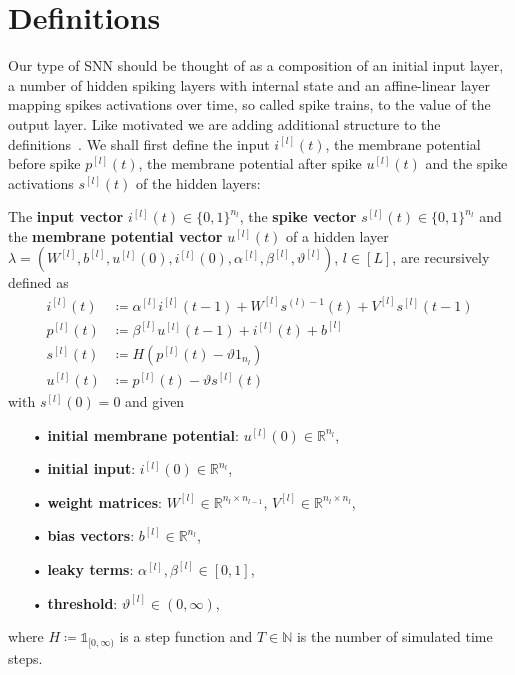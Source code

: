 \section{Definitions}
\label{ch:defs}

Our type of SNN should be thought of as a composition of an initial input layer, a number of hidden spiking layers with internal state and an affine-linear layer mapping spikes activations over time, so called spike trains, to the value of the output layer.
Like motivated we are adding additional structure to the definitions~\cite{nguyen2025timespikeunderstandingrepresentational}.
We shall first define the input \(i^{[l]}(t)\), the membrane potential before spike \(p^{[l]}(t)\), the membrane potential after spike \(u^{[l]}(t)\) and the spike activations \(s^{[l]}(t)\) of the hidden layers:

\begin{definition}
  The \textbf{input vector} \(i^{[l]}(t)∈\{0,1\}^{n_l}\), the \textbf{spike vector} \(s^{[l]}(t)∈\{0,1\}^{n_l}\) and the \textbf{membrane potential vector} \(u^{[l]}(t)\) of a hidden layer \(λ=(W^{[l]},b^{[l]},u^{[l]}(0),i^{[l]}(0),α^{[l]},β^{[l]},ϑ^{[l]})\), \(l∈[L]\), are recursively defined as
  \begin{align}
    i^{[l]}(t) & ≔ α^{[l]}i^{[l]}(t-1)+W^{[l]}s^{{(l)}-1}(t)+V^{[l]}s^{[l]}(t-1) \\
    p^{[l]}(t) & ≔ β^{[l]}u^{[l]}(t-1)+i^{[l]}(t)+b^{[l]} \\
    s^{[l]}(t) & ≔ H(p^{[l]}(t)-ϑ1_{n_l}) \\
    u^{[l]}(t) & ≔ p^{[l]}(t)-ϑs^{[l]}(t)
  \end{align}
  with \(s^{[l]}(0)=0\) and given
  \begin{enumerate}
    \item[•] \textbf{initial membrane potential}: \(u^{[l]}(0)∈ℝ^{n_l}\),
    \item[•] \textbf{initial input}: \(i^{[l]}(0)∈ℝ^{n_l}\),
    \item[•] \textbf{weight matrices}: \(W^{[l]}∈ℝ^{n_l×n_{l-1}}\), \(V^{[l]}∈ℝ^{n_l×n_l}\),
    \item[•] \textbf{bias vectors}: \(b^{[l]}∈ℝ^{n_l}\),
    \item[•] \textbf{leaky terms}: \(α^{[l]},β^{[l]}∈[0,1]\),
    \item[•] \textbf{threshold}: \(ϑ^{[l]}∈(0,∞)\),
  \end{enumerate}
  where \(H≔𝟙_{[0,∞)}\) is a step function and \(T∈ℕ\) is the number of simulated time steps.
\end{definition}

